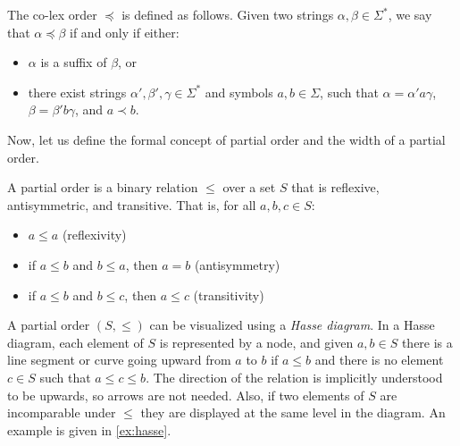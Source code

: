 \begin{definition} 
    The co-lex order $\preceq$ is defined as follows. Given two strings $\alpha, \beta \in \Sigma^*$, we say that $\alpha \preceq \beta$ if and only if either:
    \begin{itemize}
        \item $\alpha$ is a suffix of $\beta$, or
        \item there exist strings $\alpha', \beta', \gamma \in \Sigma^*$ and symbols $a, b \in \Sigma$, such that $\alpha = \alpha'a\gamma$, $\beta = \beta'b\gamma$, and $a \prec b$.
    \end{itemize}
\end{definition}

Now, let us define the formal concept of partial order and the width of a partial order. 
\begin{definition}
    A partial order is a binary relation $\leq$ over a set $S$ that is reflexive, antisymmetric, and transitive. That is, for all $a, b, c \in S$:
    \begin{itemize}
        \item $a \leq a$ (reflexivity)
        \item if $a \leq b$ and $b \leq a$, then $a = b$ (antisymmetry)
        \item if $a \leq b$ and $b \leq c$, then $a \leq c$ (transitivity)
    \end{itemize}
\end{definition}

A partial order $(S, \leq)$ can be visualized using a \textit{Hasse diagram}. In a Hasse diagram, each element of $S$ is represented by a node, and given $a,b \in S$ there is a line segment or curve going upward from $a$ to $b$ if $a \leq b$ and there is no element $c\in S$ such that $a \leq c \leq b$. The direction of the relation is implicitly understood to be upwards, so arrows are not needed. Also, if two elements of $S$ are incomparable under $\leq$ they are displayed at the same level in the diagram. An example is given in \cref{ex:hasse}.

